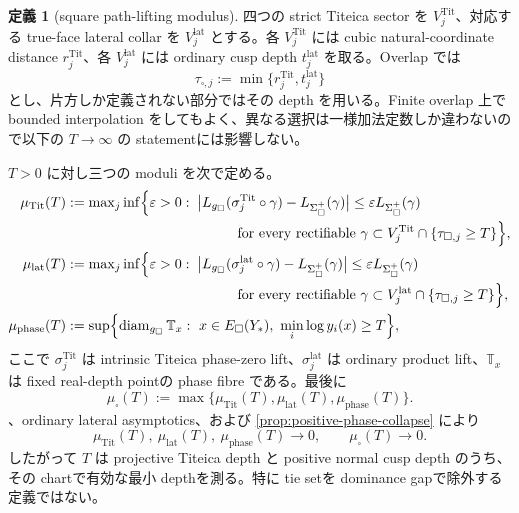 \documentclass[11pt,a4paper]{ltjsarticle}
\newcommand{\diam}{\operatorname{diam}}\newcommand{\vol}{\operatorname{vol}}
\newcommand{\Sigplus}{\Sigma_{\square}^{+}}
\newcommand{\gsq}{g_{\square}}\newcommand{\omsq}{\omega_{\square}}
\theoremstyle{plain}
\theoremstyle{definition}
\newtheorem{definition}[theorem]{定義}\newtheorem{hypothesis}[theorem]{仮定}
\theoremstyle{remark}
\begin{document}
\begin{definition}[square path-lifting modulus]\label{def:square-lift-modulus}
四つの strict Titeica sector を $V_j^{\mathrm{Tit}}$、対応する true-face lateral collar を $V_j^{\mathrm{lat}}$ とする。各 $V_j^{\mathrm{Tit}}$ には cubic natural-coordinate distance $r_j^{\mathrm{Tit}}$、各 $V_j^{\mathrm{lat}}$ には ordinary cusp depth $t_j^{\mathrm{lat}}$ を取る。Overlap では
\[
 \tau_{\square,j}:=\min\{r_j^{\mathrm{Tit}},t_j^{\mathrm{lat}}\}
\]
とし、片方しか定義されない部分ではその depth を用いる。Finite overlap 上で bounded interpolation をしてもよく、異なる選択は一様加法定数しか違わないので以下の $T\to\infty$ の statementには影響しない。

$T>0$ に対し三つの moduli を次で定める。
\begin{align*}
 \mu_{\mathrm{Tit}}(T)
 &:={\max}_{j}\inf\Bigl\{\eps>0:\;
  \bigl|L_{\gsq}(\sigma_j^{\mathrm{Tit}}\circ\gamma)-L_{\Sigplus}(\gamma)\bigr|
  \le \eps L_{\Sigplus}(\gamma)\\
 &\hspace{43mm}\text{for every rectifiable }\gamma\subset
  V_j^{\mathrm{Tit}}\cap\{\tau_{\square,j}\ge T\}\Bigr\},\\
 \mu_{\mathrm{lat}}(T)
 &:={\max}_{j}\inf\Bigl\{\eps>0:\;
  \bigl|L_{\gsq}(\sigma_j^{\mathrm{lat}}\circ\gamma)-L_{\Sigplus}(\gamma)\bigr|
  \le \eps L_{\Sigplus}(\gamma)\\
 &\hspace{43mm}\text{for every rectifiable }\gamma\subset
  V_j^{\mathrm{lat}}\cap\{\tau_{\square,j}\ge T\}\Bigr\},\\
 \mu_{\mathrm{phase}}(T)
 &:=\sup\Bigl\{\diam_{\gsq}\mathbb T_x:\
 x\in E_{\square}(Y_*),\ \min_i\log y_i(x)\ge T\Bigr\},
\end{align*}
ここで $\sigma_j^{\mathrm{Tit}}$ は intrinsic Titeica phase-zero lift、$\sigma_j^{\mathrm{lat}}$ は ordinary product lift、$\mathbb T_x$ は fixed real-depth pointの phase fibre である。最後に
\[
 \mu_\square(T):=
 \max\{\mu_{\mathrm{Tit}}(T),\mu_{\mathrm{lat}}(T),\mu_{\mathrm{phase}}(T)\}.
\]
、ordinary lateral asymptotics、および
\cref{prop:positive-phase-collapse} により
\[
 \mu_{\mathrm{Tit}}(T),\ \mu_{\mathrm{lat}}(T),\ \mu_{\mathrm{phase}}(T)\longrightarrow0,
 \qquad
 \mu_\square(T)\longrightarrow0.
\]
したがって $T$ は projective Titeica depth と positive normal cusp depth のうち、その chartで有効な最小 depthを測る。特に tie setを dominance gapで除外する定義ではない。
\end{definition}
\end{document}
